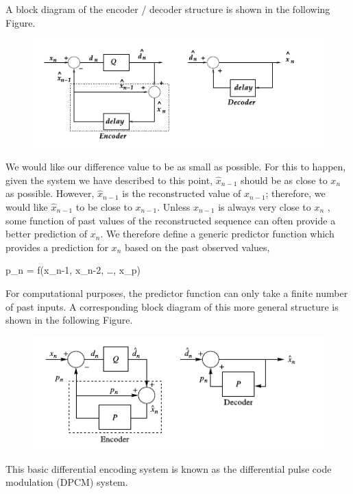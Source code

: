 A block diagram of the encoder / decoder structure is shown in the following Figure.


\begin{figure}[H]
    \centering
    \includegraphics[scale=0.7]{images/2021-08-11-diff_enc_01.png}
\end{figure}

We would like our difference value to be as small as possible. For this to happen, given the system we have described to this point, $\hat x_{n-1}$ should be as close to $x_n$ as possible. However, $\hat x_{n-1}$ is the reconstructed value of $x_{n-1}$; therefore, we would like $\hat x_{n-1}$ to be close to $x_{n-1}$. Unless $x_{n-1}$ is always very close to $x_n$ , some function of past values of the reconstructed sequence can often provide a better prediction of $x_n$. We therefore define a generic predictor function which provides a prediction for $x_n$ based on the past observed values,

\bee
p_n = f(\hat x_{n-1}, \hat x_{n-2}, \ldots, x_p)
\eee

For computational purposes, the predictor function can only take a finite number of past inputs. A corresponding block diagram of this more general structure is shown in the following Figure.

\begin{figure}[H]
    \centering
    \includegraphics[scale=0.7]{images/2021-08-11-diff_enc_02.png}
\end{figure}

This basic differential encoding system is known as the differential pulse code modulation (DPCM) system.

